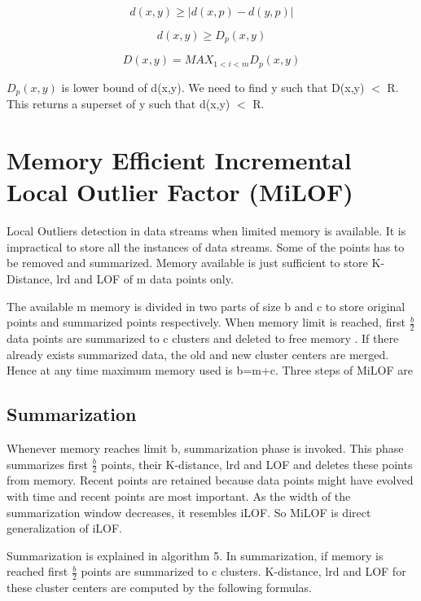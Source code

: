 \[  d(x,y) \geq |{d(x,p) - d(y,p)}| \]

\[  d(x,y) \geq D_p(x,y) \]


\[ D(x,y) =MAX_{1 < i <m} D_p(x,y) \]

$D_p(x,y)$ is lower bound of d(x,y). We need to find y such that D(x,y) $<$ R. This returns a superset of y such that d(x,y) $<$ R.





\section{Memory Efficient Incremental Local Outlier Factor (MiLOF)}

Local Outliers detection in data streams when limited memory is available. It is impractical to store all the instances of data streams. Some of the points has to be removed and summarized. Memory available is just sufficient to store K-Distance, lrd and LOF of m data points only.

The available m memory is divided in two parts of size b and c to store original points and summarized points respectively. When memory limit is reached, first ${\frac{b}{2}}$  data points are summarized to c clusters and deleted to free memory \cite{d}. If there already exists summarized data, the old and new cluster centers are merged. Hence at any time maximum memory used is b=m+c.
 Three steps of MiLOF are 

\subsection{Summarization}
Whenever memory reaches limit b, summarization phase is invoked. This phase summarizes first ${\frac{b}{2}}$ points, their K-distance, lrd and LOF and deletes these points from memory. Recent points are retained because data points might have evolved with time and recent points are most important. As the width of the summarization window decreases, it resembles iLOF. So MiLOF is direct generalization of iLOF.

\par 
Summarization  is explained in algorithm 5.
In summarization, if memory is reached first $\frac{b}{2}$ points are summarized to c clusters. K-distance, lrd and LOF for these cluster centers are computed by the following formulas.  


